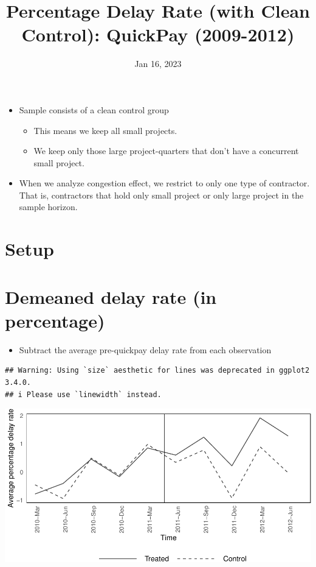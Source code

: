 \documentclass[
]{article}
\title{Percentage Delay Rate (with Clean Control): QuickPay (2009-2012)}
\author{}
\date{\vspace{-2.5em}Jan 16, 2023}
\providecommand{\tightlist}{%
  \setlength{\itemsep}{0pt}\setlength{\parskip}{0pt}}
\begin{document}
\maketitle

\begin{itemize}
\tightlist
\item
  Sample consists of a clean control group

  \begin{itemize}
  \tightlist
  \item
    This means we keep all small projects.
  \item
    We keep only those large project-quarters that don't have a
    concurrent small project.
  \end{itemize}
\item
  When we analyze congestion effect, we restrict to only one type of
  contractor. That is, contractors that hold only small project or only
  large project in the sample horizon.
\end{itemize}

\hypertarget{setup}{%
\section{Setup}\label{setup}}

\hypertarget{demeaned-delay-rate-in-percentage}{%
\section{Demeaned delay rate (in
percentage)}\label{demeaned-delay-rate-in-percentage}}

\begin{itemize}
\tightlist
\item
  Subtract the average pre-quickpay delay rate from each observation
\end{itemize}

\begin{verbatim}
## Warning: Using `size` aesthetic for lines was deprecated in ggplot2 3.4.0.
## i Please use `linewidth` instead.
\end{verbatim}

\includegraphics{qp_first_pc_delay_clean_control_files/figure-latex/demeaned_plot_one_type-1.pdf}
\end{document}
